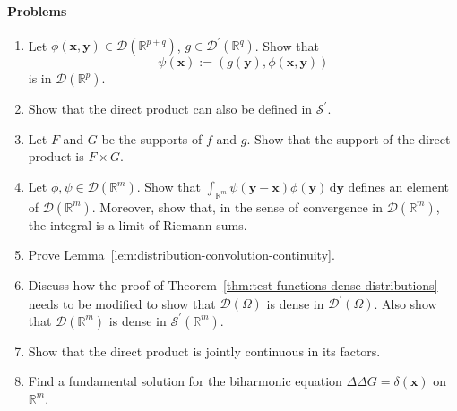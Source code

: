 \paragraph*{Problems}

\begin{enumerate}[label=\thesection.\arabic*.,ref=\thesection.\arabic*,start=33,series=book-problems]

\item\label{ex:distribution-smooth-test-parameter-map} Let $\phi(\bm{x},\bm{y})\in\mathcal{D}(\mathbb{R}^{p+q})$, $g\in\mathcal{D}^{\prime}(\mathbb{R}^q)$. Show that \[\psi(\bm{x}):=(g(\bm{y}),\phi(\bm{x},\bm{y}))\] is in $\mathcal{D}(\mathbb{R}^p)$.

\item\label{ex:tempered-direct-product} Show that the direct product can also be defined in $\mathcal{S}^{\prime}$.

\item\label{ex:direct-product-support} Let $F$ and $G$ be the supports of $f$ and $g$. Show that the support of the direct product is $F\times G$.

\item\label{ex:test-function-integral-riemann-sums} Let $\phi,\psi\in\mathcal{D}(\mathbb{R}^m)$. Show that $\int_{\mathbb{R}^m}\psi(\bm{y}-\bm{x})\phi(\bm{y})\,\mathrm{d}\bm{y}$ defines an element of $\mathcal{D}(\mathbb{R}^m)$. Moreover, show that, in the sense of convergence in $\mathcal{D}(\mathbb{R}^m)$, the integral is a limit of Riemann sums.

\item\label{ex:distribution-convolution-continuity} Prove Lemma~\ref{lem:distribution-convolution-continuity}.

\item\label{ex:test-functions-dense-tempered-distributions} Discuss how the proof of Theorem~\ref{thm:test-functions-dense-distributions} needs to be modified to show that $\mathcal{D}(\Omega)$ is dense in $\mathcal{D}^{\prime}(\Omega)$. Also show that $\mathcal{D}(\mathbb{R}^m)$ is dense in $\mathcal{S}^{\prime}(\mathbb{R}^m)$.

\item\label{ex:direct-product-joint-continuity} Show that the direct product is jointly continuous in its factors.

\item\label{ex:biharmonic-fundamental-solution} Find a fundamental solution for the biharmonic equation $\Delta\Delta G=\delta(\bm{x})$ on $\mathbb{R}^m$.


\end{enumerate}
